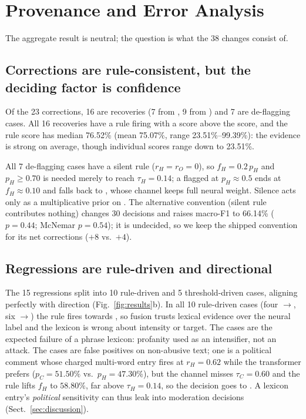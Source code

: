 \section{Provenance and Error Analysis}
\label{sec:analysis}

The aggregate result is neutral; the question is what the 38 changes consist of.

\subsection{Corrections are rule-consistent, but the deciding factor is \clean{} confidence}
\label{sec:corrections}

Of the 23 corrections, 16 are \hate{} recoveries (7 from \off{}, 9 from \clean{}) and
7 are \clean{} de-flagging cases. All 16 recoveries have a rule firing with a \hate{}
score above the \off{} score, and the rule \hate{} score has median 76.52\% (mean
75.07\%, range 23.51\%--99.39\%): the evidence is strong on average, though individual scores range down to 23.51\%.

All 7 \clean{} de-flagging cases have a silent rule ($r_H=r_O=0$), so $f_H=0.2\,p_H$
and $p_H\ge0.70$ is needed merely to reach $\tau_H=0.14$; a flagged \hate{} at
$p_H\approx0.5$ ends at $f_H\approx0.10$ and falls back to \clean{}, whose channel keeps
full neural weight. Silence acts only as a multiplicative prior on \hate{}. The
alternative convention (silent rule contributes nothing) changes 30 decisions and
raises macro-F1 to 66.14\% ($p=0.44$; McNemar $p=0.54$); it is undecided, so we keep
the shipped convention for its net corrections ($+8$ vs.\ $+4$).

\subsection{Regressions are rule-driven and directional}
\label{sec:regressions}

The 15 regressions split into 10 rule-driven and 5 threshold-driven cases, aligning
perfectly with direction (Fig.~\ref{fig:results}b). In all 10 rule-driven cases (four
\off{}$\to$\hate{}, six \clean{}$\to$\hate{}) the rule fires towards \hate{}, so fusion
trusts lexical evidence over the neural label and the lexicon is wrong about
intensity or target. The \off{} cases are the expected failure of a phrase lexicon:
profanity used as an intensifier, not an attack. The \clean{} cases are false
positives on non-abusive text; one is a political comment whose charged multi-word
entry fires at $r_H=0.62$ while the transformer prefers \clean{} ($p_C=51.50\%$ vs.\
$p_H=47.30\%$), but the \clean{} channel misses $\tau_C=0.60$ and the rule lifts $f_H$
to $58.80\%$, far above $\tau_H=0.14$, so the decision goes to \hate{}. A lexicon
entry's \emph{political} sensitivity can thus leak into moderation decisions
(Sect.~\ref{sec:discussion}).

